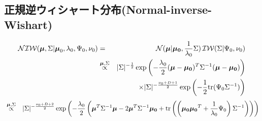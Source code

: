 \documentclass[a4j]{jarticle}
\begin{document}
\subsection{正規逆ウィシャート分布(Normal-inverse-Wishart)}
\begin{eqnarray}
\operatorname{\mathcal{NIW}}(\boldsymbol{\mu}, \Sigma | \boldsymbol{\mu}_0, \lambda_0, \Psi_0, \nu_0)
&=&
\operatorname{\mathcal{N}}(\boldsymbol{\mu} | \boldsymbol{\mu_0}, \frac{1}{\lambda_0}\Sigma)\operatorname{\mathcal{IW}}(\Sigma | \Psi_0, \nu_0) \label{NormalInverseWishart}\\
&\overset{\boldsymbol{\mu}, \Sigma}{\propto}& |\Sigma|^{-\frac{1}{2}} \exp{\left( -\frac{\lambda_0}{2}(\boldsymbol{\mu} - \boldsymbol{\mu_0})^T\Sigma^{-1}(\boldsymbol{\mu} - \boldsymbol{\mu_0}) \right)} \nonumber\\
&&~~~\times|\Sigma|^{-\frac{\nu_0+D+1}{2}}\exp{\left(-\frac{1}{2}  \textrm{tr}(\Psi_0 \Sigma^{-1})\right)}
\end{eqnarray}
\begin{eqnarray}
&\overset{\boldsymbol{\mu}, \Sigma}{\propto}&
|\Sigma|^{-\frac{\nu_0+D+2}{2}} \exp{\left( -\frac{\lambda_0}{2} \left( \boldsymbol{\mu}^T \Sigma^{-1}\boldsymbol{\mu} - 2 \boldsymbol{\mu}^T \Sigma^{-1} \boldsymbol{\mu_0} + \textrm{tr}\left(\left( \boldsymbol{\mu_0} \boldsymbol{\mu_0}^T + \frac{1}{\lambda_0} \Psi_0 \right) \Sigma^{-1} \right) \right)\right)} \nonumber \\
\end{eqnarray}
\end{document}
